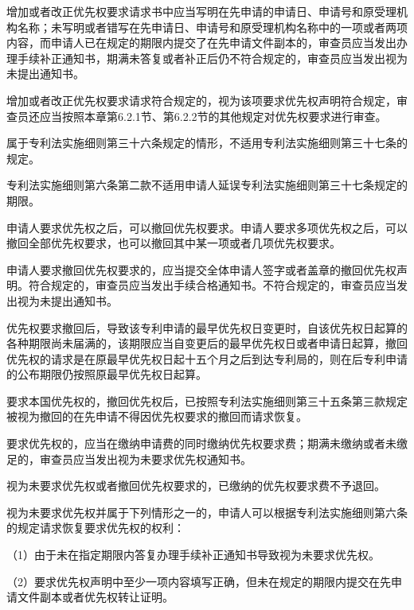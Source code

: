 增加或者改正优先权要求请求书中应当写明在先申请的申请日、申请号和原受理机构名称；未写明或者错写在先申请日、申请号和原受理机构名称中的一项或者两项内容，而申请人已在规定的期限内提交了在先申请文件副本的，审查员应当发出办理手续补正通知书，期满未答复或者补正后仍不符合规定的，审查员应当发出视为未提出通知书。

增加或者改正优先权要求请求符合规定的，视为该项要求优先权声明符合规定，审查员还应当按照本章第6.2.1节、第6.2.2节的其他规定对优先权要求进行审查。

属于专利法实施细则第三十六条规定的情形，不适用专利法实施细则第三十七条的规定。

专利法实施细则第六条第二款不适用申请人延误专利法实施细则第三十七条规定的期限。

申请人要求优先权之后，可以撤回优先权要求。申请人要求多项优先权之后，可以撤回全部优先权要求，也可以撤回其中某一项或者几项优先权要求。

申请人要求撤回优先权要求的，应当提交全体申请人签字或者盖章的撤回优先权声明。符合规定的，审查员应当发出手续合格通知书。不符合规定的，审查员应当发出视为未提出通知书。

优先权要求撤回后，导致该专利申请的最早优先权日变更时，自该优先权日起算的各种期限尚未届满的，该期限应当自变更后的最早优先权日或者申请日起算，撤回优先权的请求是在原最早优先权日起十五个月之后到达专利局的，则在后专利申请的公布期限仍按照原最早优先权日起算。

要求本国优先权的，撤回优先权后，已按照专利法实施细则第三十五条第三款规定被视为撤回的在先申请不得因优先权要求的撤回而请求恢复。

要求优先权的，应当在缴纳申请费的同时缴纳优先权要求费；期满未缴纳或者未缴足的，审查员应当发出视为未要求优先权通知书。

视为未要求优先权或者撤回优先权要求的，已缴纳的优先权要求费不予退回。

视为未要求优先权并属于下列情形之一的，申请人可以根据专利法实施细则第六条的规定请求恢复要求优先权的权利：

{\setlength{\parindent}{17.1bp}（1）由于未在指定期限内答复办理手续补正通知书导致视为未要求优先权。\par}

{\setlength{\parindent}{17.1bp}（2）要求优先权声明中至少一项内容填写正确，但未在规定的期限内提交在先申请文件副本或者优先权转让证明。\par}

